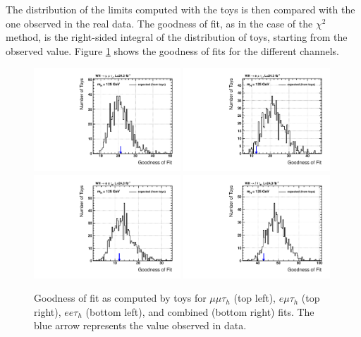 The distribution of the limits computed with the toys is then compared with the one observed in the real data. The goodness of fit, as in the case of the $\chi^2$ method, is the right-sided integral of the distribution of toys, starting from the observed value. Figure \ref{fig:gof} shows the goodness of fits for the different channels.

\begin{figure}
\begin{center}
  \includegraphics[width=0.49\textwidth]{4_Analisys/pics/GoF/mmt-goodness-of-fit-125.pdf}
  \includegraphics[width=0.49\textwidth]{4_Analisys/pics/GoF/emt-goodness-of-fit-125.pdf}\\
  \includegraphics[width=0.49\textwidth]{4_Analisys/pics/GoF/eet-goodness-of-fit-125.pdf}
  \includegraphics[width=0.49\textwidth]{4_Analisys/pics/GoF/vhtt_wh-goodness-of-fit-125.pdf}\\
  \caption{Goodness of fit as computed by toys for $\mu\mu\tau_h$ (top left), $e\mu\tau_h$ (top right), $ee\tau_h$ (bottom left), and combined (bottom right) fits. The blue arrow represents the value observed in data.}
  \label{fig:gof}
\end{center}
\end{figure}



